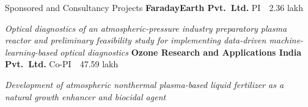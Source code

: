 \begin{rubric}{Sponsored and Consultancy Projects}
\entry*[2025]%
  \textbf{FaradayEarth Pvt.\ Ltd.} \hfill PI \textperiodcentered\ \scalebox{0.8}{\faRupeeSign}\,2.36 lakh \textperiodcentered\ \par
  \emph{Optical diagnostics of an atmospheric-pressure industry preparatory plasma reactor and preliminary feasibility study for implementing data-driven machine-learning-based optical diagnostics}
\entry*[2024 -- 2025]%
  \textbf{Ozone Research and Applications India Pvt.\ Ltd.} \hfill Co-PI \textperiodcentered\ \scalebox{0.8}{\faRupeeSign}\,47.59 lakh \textperiodcentered\ \par
  \emph{Development of atmospheric nonthermal plasma-based liquid fertilizer as a natural growth enhancer and biocidal agent}
\end{rubric}
